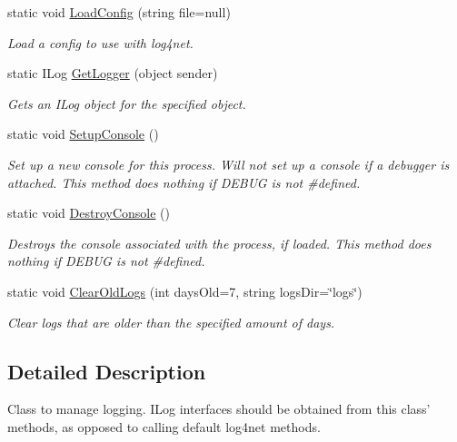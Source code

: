 \begin{DoxyCompactItemize}
\item 
static void \hyperlink{class_tri_devs_1_1_tri_engine2_d_1_1_logging_1_1_log_manager_ac3fa271dd594c78c0ace7bd28f0b3309}{Load\-Config} (string file=null)
\begin{DoxyCompactList}\small\item\em Load a config to use with log4net. \end{DoxyCompactList}\item 
static I\-Log \hyperlink{class_tri_devs_1_1_tri_engine2_d_1_1_logging_1_1_log_manager_a08a92793a69df04598de7e2ef26525b9}{Get\-Logger} (object sender)
\begin{DoxyCompactList}\small\item\em Gets an I\-Log object for the specified object. \end{DoxyCompactList}\item 
static void \hyperlink{class_tri_devs_1_1_tri_engine2_d_1_1_logging_1_1_log_manager_a674a0fcc99cd6101fbe655e626d3f24b}{Setup\-Console} ()
\begin{DoxyCompactList}\small\item\em Set up a new console for this process. Will not set up a console if a debugger is attached. This method does nothing if D\-E\-B\-U\-G is not \#defined. \end{DoxyCompactList}\item 
static void \hyperlink{class_tri_devs_1_1_tri_engine2_d_1_1_logging_1_1_log_manager_aa08e7d3ce6fce68baddeef73861bce50}{Destroy\-Console} ()
\begin{DoxyCompactList}\small\item\em Destroys the console associated with the process, if loaded. This method does nothing if D\-E\-B\-U\-G is not \#defined. \end{DoxyCompactList}\item 
static void \hyperlink{class_tri_devs_1_1_tri_engine2_d_1_1_logging_1_1_log_manager_a869d712123422786e4e6f738bb68bee1}{Clear\-Old\-Logs} (int days\-Old=7, string logs\-Dir=\char`\"{}logs\char`\"{})
\begin{DoxyCompactList}\small\item\em Clear logs that are older than the specified amount of days. \end{DoxyCompactList}\end{DoxyCompactItemize}


\subsection{Detailed Description}
Class to manage logging. I\-Log interfaces should be obtained from this class' methods, as opposed to calling default log4net methods. 



